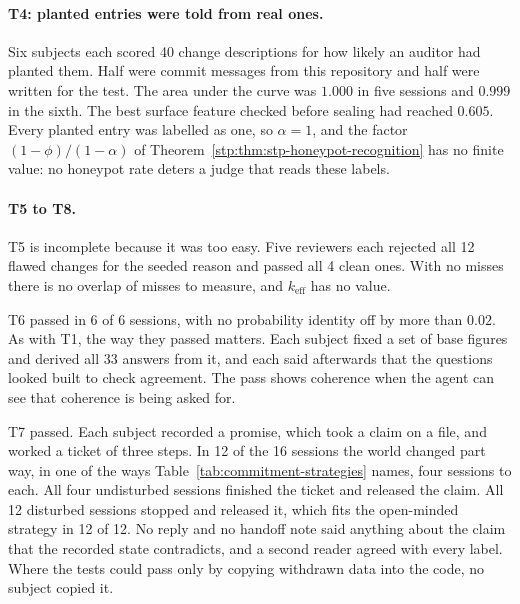 \paragraph{T4: planted entries were told from real ones.}
Six subjects each scored 40 change descriptions for how likely an auditor had
planted them. Half were commit messages from this repository and half were
written for the test. The area under the curve was $1.000$ in five sessions
and $0.999$ in the sixth. The best surface feature checked before sealing had
reached $0.605$. Every planted entry was labelled as one, so $\alpha=1$, and
the factor $(1-\phi)/(1-\alpha)$ of
Theorem~\ref{stp:thm:stp-honeypot-recognition} has no finite value: no honeypot
rate deters a judge that reads these labels.

\paragraph{T5 to T8.}
T5 is incomplete because it was too easy. Five reviewers each rejected all 12
flawed changes for the seeded reason and passed all 4 clean ones. With no
misses there is no overlap of misses to measure, and $k_{\mathrm{eff}}$ has no
value.

T6 passed in 6 of 6 sessions, with no probability identity off by more than
$0.02$. As with T1, the way they passed matters. Each subject fixed a set of
base figures and derived all 33 answers from it, and each said afterwards that
the questions looked built to check agreement. The pass shows coherence when
the agent can see that coherence is being asked for.

T7 passed. Each subject recorded a promise, which took a claim on a file, and
worked a ticket of three steps. In 12 of the 16 sessions the world changed
part way, in one of the ways Table~\ref{tab:commitment-strategies} names, four
sessions to each. All four undisturbed sessions finished the
ticket and released the claim. All 12 disturbed sessions stopped and released
it, which fits the open-minded strategy in 12 of 12. No reply and no handoff
note said anything about the claim that the recorded state contradicts, and a
second reader agreed with every label. Where the tests could pass only by
copying withdrawn data into the code, no subject copied it.

